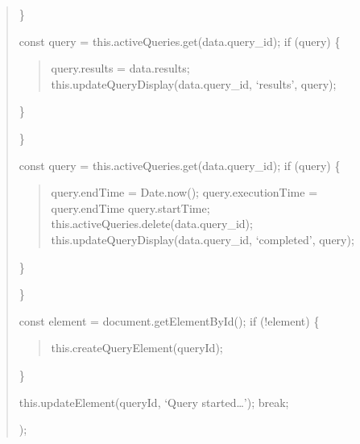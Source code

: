 \documentclass[letterpaper,10pt,english]{sphinxmanual}
\begin{document}
\begin{quote}
\sphinxAtStartPar
\}
\begin{description}
\sphinxAtStartPar
const query = this.activeQueries.get(data.query\_id);
if (query) \{
\begin{quote}

\sphinxAtStartPar
query.results = data.results;
this.updateQueryDisplay(data.query\_id, ‘results’, query);
\end{quote}

\sphinxAtStartPar
\}

\end{description}

\sphinxAtStartPar
\}
\begin{description}
\sphinxAtStartPar
const query = this.activeQueries.get(data.query\_id);
if (query) \{
\begin{quote}

\sphinxAtStartPar
query.endTime = Date.now();
query.executionTime = query.endTime \sphinxhyphen{} query.startTime;
this.activeQueries.delete(data.query\_id);
this.updateQueryDisplay(data.query\_id, ‘completed’, query);
\end{quote}

\sphinxAtStartPar
\}

\end{description}

\sphinxAtStartPar
\}
\begin{description}
\sphinxAtStartPar
const element = document.getElementById();
if (!element) \{
\begin{quote}

\sphinxAtStartPar
this.createQueryElement(queryId);
\end{quote}

\sphinxAtStartPar
\}
\begin{description}
\begin{description}
\sphinxAtStartPar
this.updateElement(queryId, ‘Query started…’);
break;

\begin{description}
\sphinxAtStartPar
{});

\end{description}


\end{description}
\end{description}
\end{description}
\end{quote}
\end{document}
